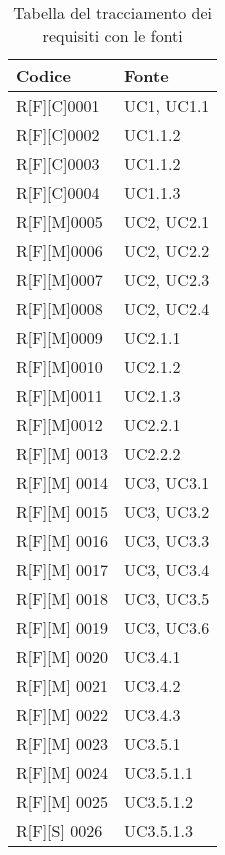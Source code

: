 \begin{center}
    \begin{longtable}{|p{3cm}|p{3cm}|}%
    \caption{Tabella del tracciamento dei requisiti con le fonti}
    \label{tab:requisiti-fonte}
    \endfirsthead
    \endhead
    \hline
    \textbf{Codice}  & \textbf{Fonte}\\
    \hline
    R[F][C]0001    & UC1, UC1.1  \\
    \hline
    R[F][C]0002   & UC1.1.2  \\
    \hline
    R[F][C]0003    & UC1.1.2  \\
    \hline
    R[F][C]0004    & UC1.1.3  \\
    \hline
    R[F][M]0005    & UC2, UC2.1  \\
    \hline
    R[F][M]0006    & UC2, UC2.2  \\
    \hline
    R[F][M]0007    & UC2, UC2.3  \\
    \hline
    R[F][M]0008    & UC2, UC2.4  \\
    \hline
    R[F][M]0009    & UC2.1.1  \\
    \hline
    R[F][M]0010    & UC2.1.2  \\
    \hline
    R[F][M]0011    & UC2.1.3  \\
    \hline
    R[F][M]0012    & UC2.2.1  \\
    \hline
    R[F][M] 0013    & UC2.2.2  \\
    \hline
    R[F][M] 0014    & UC3, UC3.1  \\
    \hline
    R[F][M] 0015    & UC3, UC3.2  \\
    \hline
    R[F][M] 0016    & UC3, UC3.3  \\
    \hline
    R[F][M] 0017    & UC3, UC3.4  \\
    \hline
    R[F][M] 0018    & UC3, UC3.5  \\
    \hline
    R[F][M] 0019    & UC3, UC3.6  \\
    \hline
    R[F][M] 0020    & UC3.4.1  \\
    \hline
    R[F][M] 0021    & UC3.4.2  \\
    \hline
    R[F][M] 0022    & UC3.4.3  \\
    \hline
    R[F][M] 0023    & UC3.5.1  \\
    \hline
    R[F][M] 0024    & UC3.5.1.1  \\
    \hline
    R[F][M] 0025    & UC3.5.1.2  \\
    \hline
    R[F][S] 0026    & UC3.5.1.3  \\
    \hline

\end{longtable}
\end{center}

